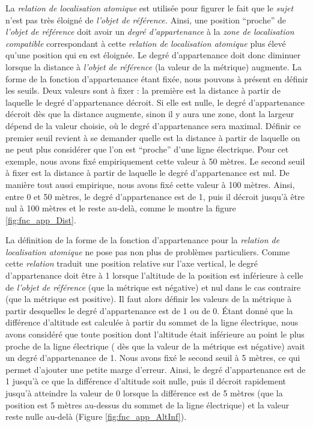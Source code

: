 La \emph{relation de localisation atomique}  est
utilisée pour figurer le fait que le \emph{sujet} n'est pas très
éloigné de \emph{l'objet de référence.} Ainsi, une position
\enquote{proche} de \emph{l'objet de référence} doit avoir un
\emph{degré d'appartenance} à la \emph{zone de localisation
  compatible} correspondant à cette \emph{relation de localisation
  atomique} plus élevé qu'une position qui en est éloignée. Le degré
d'appartenance doit donc diminuer lorsque la distance à \emph{l'objet
  de référence} (\ie la valeur de la métrique) augmente. La forme de
la fonction d'appartenance étant fixée, nous pouvons à présent en
définir les seuils. Deux valeurs sont à fixer : la première est la
distance à partir de laquelle le degré d'appartenance décroit. Si elle
est nulle, le degré d’appartenance décroit dès que la distance
augmente, sinon il y aura une zone, dont la largeur dépend de la
valeur choisie, où le degré d'appartenance sera maximal. Définir ce
premier seuil revient à se demander quelle est la distance à partir de
laquelle on ne peut plus considérer que l'on est \enquote{proche}
d'une ligne électrique. Pour cet exemple, nous avons fixé
empiriquement cette valeur à 50 mètres. Le second seuil à fixer est la
distance à partir de laquelle le degré d'appartenance est nul. De
manière tout aussi empirique, nous avons fixé cette valeur à 100
mètres. Ainsi, entre 0 et 50 mètres, le degré d'appartenance est de 1,
puis il décroit jusqu’à être nul à 100 mètres et le reste au-delà,
comme le montre la figure \ref{fig:fnc_app_Dist}.

La définition de la forme de la fonction d'appartenance pour la
\emph{relation de localisation atomique}
 ne pose
pas non plus de problèmes particuliers. Comme cette \emph{relation}
traduit une position relative sur l'axe vertical, le degré
d'appartenance doit être à 1 lorsque l'altitude de la position est
inférieure à celle de \emph{l'objet de référence} (\ie que la métrique
est négative) et nul dans le cas contraire (\ie que la métrique est
positive). Il faut alors définir les valeurs de la métrique à partir
desquelles le degré d'appartenance est de 1 ou de 0. Étant donné que
la différence d'altitude est calculée à partir du sommet de la ligne
électrique, nous avons considéré que toute position dont l'altitude
était inférieure au point le plus proche de la ligne électrique (\ie
dès que la valeur de la métrique est négative) avait un degré
d'appartenance de 1. Nous avons fixé le second seuil à 5 mètres, ce
qui permet d'ajouter une petite marge d'erreur. Ainsi, le degré
d'appartenance est de 1 jusqu’à ce que la différence d'altitude soit
nulle, puis il décroit rapidement jusqu'à atteindre la valeur de 0
lorsque la différence est de 5 mètres (\ie que la position est 5
mètres au-dessus du sommet de la ligne électrique) et la valeur reste
nulle au-delà (Figure \ref{fig:fnc_app_AltInf}).

